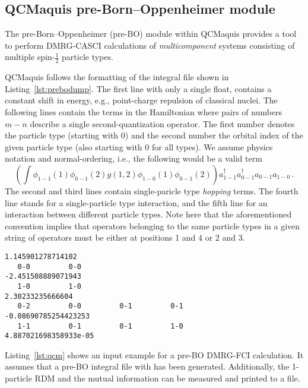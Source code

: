 \documentclass[bibliography=totoc,12pt,a4paper]{scrartcl}
\begin{document}
\clearpage
\newpage


\subsection{QCMaquis pre-Born--Oppenheimer module}\label{sec:preBO}

The pre-Born--Oppenheimer (pre-BO) module within QCMaquis provides a tool to perform
DMRG-CASCI calculations of \textit{multicomponent} systems consisting of multiple spin-$\frac12$
particle types.

QCMaquis follows the formatting of the integral file shown in
Listing~\ref{lst:prebodump}. The first line with only a single float,
contains a constant shift in energy, e.g., point-charge repulsion of classical
nuclei.
The following lines contain the terms in the Hamiltonian where pairs of numbers
$m-n$ describe a single second-quantization operator. The first number denotes
the particle type (starting with 0) and the second number the orbital index of
the given particle type (also starting with 0 for all types). 
We assume physics notation and normal-ordering, i.e., the following would be a
valid term
\begin{equation}
  \left(\int \phi_{1-1}(1)\phi_{0-1}(2)g(1,2)\phi_{1-0}(1)\phi_{0-1}(2)\right)
  a^\dagger_{1-1} a^\dagger_{0-1} a_{0-1} a_{1-0}\,.
\end{equation}
The second and third lines contain single-paricle type \textit{hopping} terms.
The fourth line stands for a single-particle type interaction, and the fifth
line for an interaction between different particle types. 
Note here that the aforementioned convention implies that operators belonging to
the same particle types in a given string of operators must be either at
positions 1 and 4 or 2 and 3. 

\begin{lstlisting}[language=qcmaquis,caption={Pre-BO integral file
format.},label=lst:prebodump]
1.145901278714102                       
   0-0         0-0                                      -2.451508889071943
   1-0         1-0                                      2.30233235666604
   0-2         0-0         0-1         0-1              -0.08690785254423253
   1-1         0-1         0-1         1-0              4.887021698358933e-05
\end{lstlisting}

Listing~\ref{lst:qcm} shows an input example for a pre-BO DMRG-FCI calculation. 
It assumes that a pre-BO integral file with has been generated. Additionally,
the 1-particle RDM and the mutual information can be measured and printed to a
file.
\end{document}
